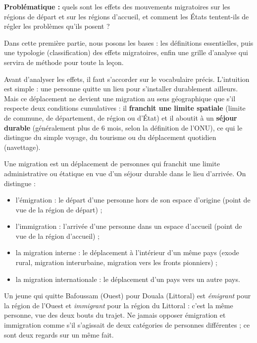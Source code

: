 \documentclass[11pt]{article}
\newcommand{\cle}[1]{{\popxbold\color{popdark}#1}}
\newcounter{popsec}
\newcounter{popsub}
\newcommand{\courssub}[1]{%
  \stepcounter{popsub}%
  \par\vspace{9pt}\noindent{\popxbold\fontsize{11.5}{13}\selectfont\color{popink}{\color{poporange}\thepopsec.\thepopsub}\hspace{6pt}#1}\par\nopagebreak\vspace{4pt}
}
\begin{document}
\textbf{Problématique :} quels sont les effets des mouvements migratoires sur les régions de départ et sur les régions d'accueil, et comment les États tentent-ils de régler les problèmes qu'ils posent ?

Dans cette première partie, nous posons les bases : les définitions essentielles, puis une \cle{typologie} (classification) des effets migratoires, enfin une grille d'analyse qui servira de méthode pour toute la leçon.

\courssub{Rappel des définitions fondamentales}

Avant d'analyser les effets, il faut s'accorder sur le vocabulaire précis. L'intuition est simple : une personne quitte un lieu pour s'installer durablement ailleurs. Mais ce déplacement ne devient une \cle{migration} au sens géographique que s'il respecte deux conditions cumulatives : il \textbf{franchit une limite spatiale} (limite de commune, de département, de région ou d'État) et il aboutit à un \textbf{séjour durable} (généralement plus de 6 mois, selon la définition de l'ONU), ce qui le distingue du simple voyage, du tourisme ou du déplacement quotidien (navettage).

\begin{definition}[Migration]
Une \cle{migration} est un déplacement de personnes qui franchit une limite administrative ou étatique en vue d'un séjour durable dans le lieu d'arrivée. On distingue :
\begin{itemize}
\item l'\cle{émigration} : le départ d'une personne hors de son espace d'origine (point de vue de la région de départ) ;
\item l'\cle{immigration} : l'arrivée d'une personne dans un espace d'accueil (point de vue de la région d'accueil) ;
\item la \cle{migration interne} : le déplacement à l'intérieur d'un même pays (exode rural, migration interurbaine, migration vers les fronts pionniers) ;
\item la \cle{migration internationale} : le déplacement d'un pays vers un autre pays.
\end{itemize}
\end{definition}

\begin{attention}
Un jeune qui quitte Bafoussam (Ouest) pour Douala (Littoral) est \emph{émigrant} pour la région de l'Ouest et \emph{immigrant} pour la région du Littoral : c'est la même personne, vue des deux bouts du trajet. Ne jamais opposer émigration et immigration comme s'il s'agissait de deux catégories de personnes différentes ; ce sont deux regards sur un même fait.
\end{attention}
\end{document}
